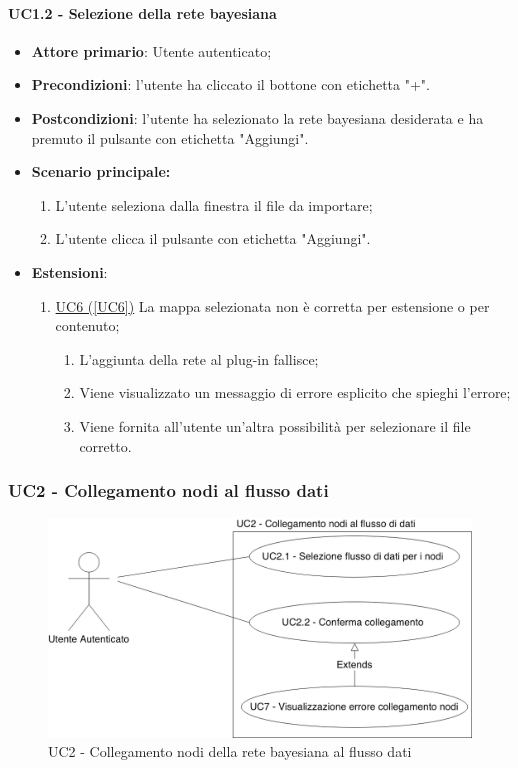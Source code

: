 \paragraph{UC1.2 - Selezione della rete bayesiana}\label{UC1.2}
\begin{itemize}
	\item \textbf{Attore primario}: Utente autenticato;
	\item \textbf{Precondizioni}: l'utente ha cliccato il bottone con etichetta "+".
	\item \textbf{Postcondizioni}: l'utente ha selezionato la rete bayesiana desiderata e ha premuto il pulsante con etichetta "Aggiungi".
	\item \textbf{Scenario principale:}
	\begin{enumerate}
		\item L'utente seleziona dalla finestra il file da importare;
		\item L'utente clicca il pulsante con etichetta "Aggiungi".
	\end{enumerate}
	\item \textbf{Estensioni}:
	\begin{enumerate}
		\item \hyperref[UC6]{UC6 (\ref*{UC6})} La mappa selezionata non è corretta per estensione o per contenuto;
		\begin{enumerate}
			\item L'aggiunta della rete al plug-in fallisce;
			\item Viene visualizzato un messaggio di errore esplicito che spieghi l'errore;
			\item Viene fornita all'utente un'altra possibilità per selezionare il file corretto.
		\end{enumerate}
	\end{enumerate}
\end{itemize}

\pagebreak

\subsubsection{UC2 - Collegamento nodi al flusso dati}\label{UC2}

\begin{figure}[H]
\centering
\includegraphics[scale=0.3]{./images/UC2.png}
\caption{UC2 - Collegamento nodi della rete bayesiana al flusso dati}
\end{figure}

